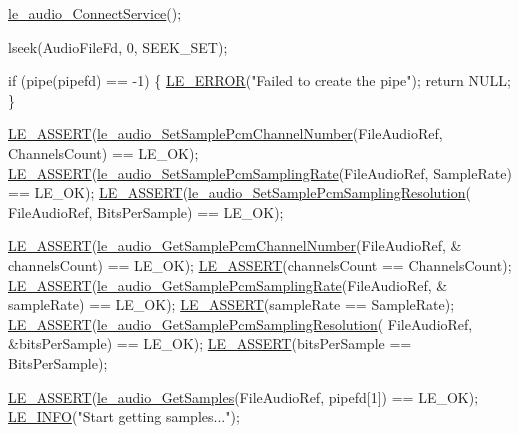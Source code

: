 \begin{DoxyCodeInclude}
{{{{{    \hyperlink{le__audio__interface_8h_a65a8844fc6d2e1b7ed78f33bef1b9990}{le\_audio\_ConnectService}();

    lseek(AudioFileFd, 0, SEEK\_SET);

    \textcolor{keywordflow}{if} (pipe(pipefd) == -1)
    \{
        \hyperlink{le__log_8h_a353590f91b3143a7ba3a416ae5a50c3d}{LE\_ERROR}(\textcolor{stringliteral}{"Failed to create the pipe"});
        \textcolor{keywordflow}{return} NULL;
    \}

    \hyperlink{le__log_8h_ac0dbbef91dc0fed449d0092ff0557b39}{LE\_ASSERT}(\hyperlink{le__audio__interface_8h_aae7db9f0933119fb5a61162722b3274a}{le\_audio\_SetSamplePcmChannelNumber}(FileAudioRef, 
      ChannelsCount) == LE\_OK);
    \hyperlink{le__log_8h_ac0dbbef91dc0fed449d0092ff0557b39}{LE\_ASSERT}(\hyperlink{le__audio__interface_8h_a04adfcc0e8f5796eca53c31cd5dd6528}{le\_audio\_SetSamplePcmSamplingRate}(FileAudioRef, 
      SampleRate) == LE\_OK);
    \hyperlink{le__log_8h_ac0dbbef91dc0fed449d0092ff0557b39}{LE\_ASSERT}(\hyperlink{le__audio__interface_8h_aae37b46c13f76144dd94c48bfe94998b}{le\_audio\_SetSamplePcmSamplingResolution}(
      FileAudioRef, BitsPerSample) == LE\_OK);

    \hyperlink{le__log_8h_ac0dbbef91dc0fed449d0092ff0557b39}{LE\_ASSERT}(\hyperlink{le__audio__interface_8h_a40bf3633c3050a7526a100562edc97f9}{le\_audio\_GetSamplePcmChannelNumber}(FileAudioRef, &
      channelsCount) == LE\_OK);
    \hyperlink{le__log_8h_ac0dbbef91dc0fed449d0092ff0557b39}{LE\_ASSERT}(channelsCount == ChannelsCount);
    \hyperlink{le__log_8h_ac0dbbef91dc0fed449d0092ff0557b39}{LE\_ASSERT}(\hyperlink{le__audio__interface_8h_a80fb48632ce8f638cea4a3e5d333d66f}{le\_audio\_GetSamplePcmSamplingRate}(FileAudioRef, &
      sampleRate) == LE\_OK);
    \hyperlink{le__log_8h_ac0dbbef91dc0fed449d0092ff0557b39}{LE\_ASSERT}(sampleRate == SampleRate);
    \hyperlink{le__log_8h_ac0dbbef91dc0fed449d0092ff0557b39}{LE\_ASSERT}(\hyperlink{le__audio__interface_8h_a70b9f904ce225aad4fb80b8b24a1f92a}{le\_audio\_GetSamplePcmSamplingResolution}(
      FileAudioRef, &bitsPerSample) == LE\_OK);
    \hyperlink{le__log_8h_ac0dbbef91dc0fed449d0092ff0557b39}{LE\_ASSERT}(bitsPerSample == BitsPerSample);

    \hyperlink{le__log_8h_ac0dbbef91dc0fed449d0092ff0557b39}{LE\_ASSERT}(\hyperlink{le__audio__interface_8h_a9c55a59849afcbb2ccef88cd4265782e}{le\_audio\_GetSamples}(FileAudioRef, pipefd[1]) == LE\_OK);
    \hyperlink{le__log_8h_a23e6d206faa64f612045d688cdde5808}{LE\_INFO}(\textcolor{stringliteral}{"Start getting samples..."});

}}}}}
\end{DoxyCodeInclude}
